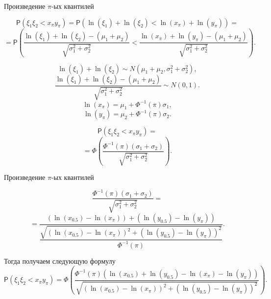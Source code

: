 \documentclass[ucs, notheorems, handout]{beamer}
\begin{document}
	\begin{frame}{Произведение $\pi$-ых квантилей}
		
		\begin{equation*}
			\mathsf{P}(\xi_{1}\xi_{2}< x_{\pi}y_{\pi}) = \mathsf{P}(\ln(\xi_{1})+\ln(\xi_{2})<\ln(x_{\pi})+\ln(y_{\pi}))=
		\end{equation*}
		\begin{equation*}
			=\mathsf{P}\left(\displaystyle{\frac{\ln(\xi_{1})+\ln(\xi_{2})-(\mu_{1}+\mu_{2})}{\sqrt{\sigma_{1}^{2}+\sigma_{2}^{2}}}}<\displaystyle{\frac{\ln(x_{\pi})+\ln(y_{\pi})-(\mu_{1}+\mu_{2})}{\sqrt{\sigma_{1}^{2}+\sigma_{2}^{2}}}}\right).
		\end{equation*}
		
		\begin{equation*} 
			\ln(\xi_{1})+\ln(\xi_{2})\sim N(\mu_{1}+\mu_{2}, \sigma_{1}^{2}+\sigma_{2}^{2}),
		\end{equation*}
		\begin{equation*}
			\frac{\ln(\xi_{1})+\ln(\xi_{2})-(\mu_{1}+\mu_{2})}{\sqrt{\sigma_{1}^{2}+\sigma_{2}^{2}}} \sim N(0,1).
		\end{equation*}
		\begin{equation*}
			\ln(x_{\pi})=\mu_{1}+\Phi^{-1}(\pi)\sigma_{1},
		\end{equation*}
		\begin{equation*}
			\ln(y_{\pi})=\mu_{2}+\Phi^{-1}(\pi)\sigma_{2}.
		\end{equation*}
	
		\begin{equation*}
			\mathsf{P}(\xi_{1}\xi_{2}< x_{\pi}y_{\pi}) =
		\end{equation*}
		\begin{equation*}
			=\Phi\left(\frac{\Phi^{-1}(\pi)(\sigma_{1}+\sigma_{2})}{\sqrt{\sigma_{1}^{2}+\sigma_{2}^{2}}}\right).
		\end{equation*}
	
	\end{frame}
	\begin{frame}{Произведение $\pi$-ых квантилей}
		
			\[\frac{\Phi^{-1}(\pi)(\sigma_{1}+\sigma_{2})}{\sqrt{\sigma_{1}^{2}+\sigma_{2}^{2}}}=\]\[=
			\dfrac{(\ln(x_{0.5})-\ln(x_{\pi}))+(\ln(y_{0.5})-\ln(y_{\pi}))}{\dfrac{\sqrt{(\ln(x_{0.5})-\ln(x_{\pi}))^{2}+(\ln(y_{0.5})-\ln(y_{\pi}))^{2}}}{\Phi^{-1}(\pi)}}.\]
		
		
		Тогда получаем следующую формулу
		\begin{equation*}
			\mathsf{P}(\xi_{1}\xi_{2}< x_{\pi}y_{\pi}) =\Phi\left(\frac{\Phi^{-1}(\pi)(\ln(x_{0.5})+\ln(y_{0.5})-\ln(x_{\pi})-\ln(y_{\pi}))}{\sqrt{(\ln(x_{0.5})-\ln(x_{\pi}))^{2}+(\ln(y_{0.5})-\ln(y_{\pi}))^{2}}}\right).
		\end{equation*}
	\end{frame}
\end{document}
